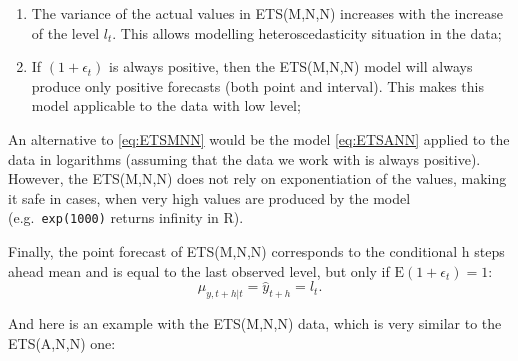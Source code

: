 \documentclass[
]{book}
\newenvironment{Shaded}{\begin{snugshade}}{\end{snugshade}}
\newcommand{\AttributeTok}[1]{\textcolor[rgb]{0.77,0.63,0.00}{#1}}
\newcommand{\ConstantTok}[1]{\textcolor[rgb]{0.00,0.00,0.00}{#1}}
\newcommand{\DecValTok}[1]{\textcolor[rgb]{0.00,0.00,0.81}{#1}}
\newcommand{\FloatTok}[1]{\textcolor[rgb]{0.00,0.00,0.81}{#1}}
\newcommand{\FunctionTok}[1]{\textcolor[rgb]{0.00,0.00,0.00}{#1}}
\newcommand{\NormalTok}[1]{#1}
\newcommand{\OtherTok}[1]{\textcolor[rgb]{0.56,0.35,0.01}{#1}}
\newcommand{\SpecialCharTok}[1]{\textcolor[rgb]{0.00,0.00,0.00}{#1}}
\newcommand{\StringTok}[1]{\textcolor[rgb]{0.31,0.60,0.02}{#1}}
\providecommand{\tightlist}{%
  \setlength{\itemsep}{0pt}\setlength{\parskip}{0pt}}
\theoremstyle{definition}
\theoremstyle{definition}
\theoremstyle{definition}
\theoremstyle{definition}
\theoremstyle{remark}
\begin{document}
\begin{enumerate}
\def\labelenumi{\arabic{enumi}.}
\tightlist
\item
  The variance of the actual values in ETS(M,N,N) increases with the increase of the level \(l_{t}\). This allows modelling heteroscedasticity situation in the data;
\item
  If \((1+\epsilon_t)\) is always positive, then the ETS(M,N,N) model will always produce only positive forecasts (both point and interval). This makes this model applicable to the data with low level;
\end{enumerate}

An alternative to \eqref{eq:ETSMNN} would be the model \eqref{eq:ETSANN} applied to the data in logarithms (assuming that the data we work with is always positive). However, the ETS(M,N,N) does not rely on exponentiation of the values, making it safe in cases, when very high values are produced by the model (e.g.~\texttt{exp(1000)} returns infinity in R).

Finally, the point forecast of ETS(M,N,N) corresponds to the conditional h steps ahead mean and is equal to the last observed level, but only if \(\text{E}(1+\epsilon_t)=1\):
\begin{equation}
    \mu_{y,t+h|t} = \hat{y}_{t+h} = l_{t} .
  \label{eq:ETSMNNForecast}
\end{equation}

And here is an example with the ETS(M,N,N) data, which is very similar to the ETS(A,N,N) one:

\begin{Shaded}
\end{Shaded}
\end{document}
